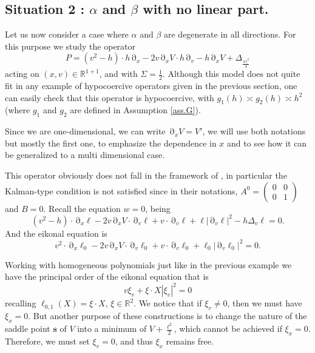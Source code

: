 \documentclass[12pt]{amsart}
\newcommand{\R}{\mathbb R}
\numberwithin{equation}{section}
\numberwithin{figure}{section}
\def\s{\mathbf{s}}
\DeclareMathOperator{\p}{\partial}
\begin{document}
\subsection{Situation 2 : $\alpha$ and $\beta$ with no linear part.}\label{ssec:nolin}

Let us now consider a case where $\alpha$ and $\beta$ are degenerate in all directions. For this purpose we study the %
operator
\begin{equation*}
P =  (v^2-h)\cdot h\p_x - 2v\p_xV\cdot h\p_v - h\p_xV + \Delta_{\frac{|v|^2}{4}}
\end{equation*}
acting %
on $(x,v)\in\R^{1+1}$, and with $\Sigma = \frac12$. Although this model does not quite fit in any example of hypocoercive operators given in the previous section, one can easily check that this operator is hypocoercive, with $g_1(h) \asymp g_2(h) \asymp h^2$ (where $g_1$ and $g_2$ are defined in Assumption \ref{ass.G}).

Since we are one-dimensional, we can write $\p_xV = V'$, we will use both notations but mostly the first one, to emphasize the dependence in $x$ and to see how it can be generalized to a multi dimensional case.

This operator obviously does not fall in the framework of \cite{BoLePMi22}, in particular the Kalman-type condition \cite[Remark 2.5]{BoLePMi22} is not satisfied since in their notations, $A^0 = \begin{pmatrix}0&0\\0&1\end{pmatrix}$ and $B = 0$. Recall the equation $w=0$, being
\begin{equation}\label{eq:w=0situ2}
(v^2-h)\cdot \p_x\ell - 2v\p_xV\cdot \p_v\ell + v\cdot\p_v\ell + \ell|\p_v\ell|^2 - h\Delta_v\ell = 0.
\end{equation}
And the eikonal equation is
\begin{equation*}
v^2\cdot \p_x\ell_0 - 2v\p_xV\cdot \p_v\ell_0 + v\cdot\p_v\ell_0 + \ell_0|\p_v\ell_0|^2 = 0.
\end{equation*}

Working with homogeneous polynomials just like in the previous example we have the principal order of the eikonal equation that is
\begin{equation*}
v\xi_v + \xi\cdot X|\xi_v|^2 = 0
\end{equation*}
recalling $\ell_{0,1}(X) = \xi\cdot X$, $\xi\in\R^2$. We notice that if $\xi_v\neq0$, then we must have $\xi_x=0$. But another purpose of these constructions is to change the nature of the saddle point $\s$ of $V$ into a minimum of $V + \frac{\ell^2}{2}$, which cannot be achieved if $\xi_x=0$. Therefore, we must set $\xi_v=0$, and thus $\xi_x$ remains free.
\end{document}
